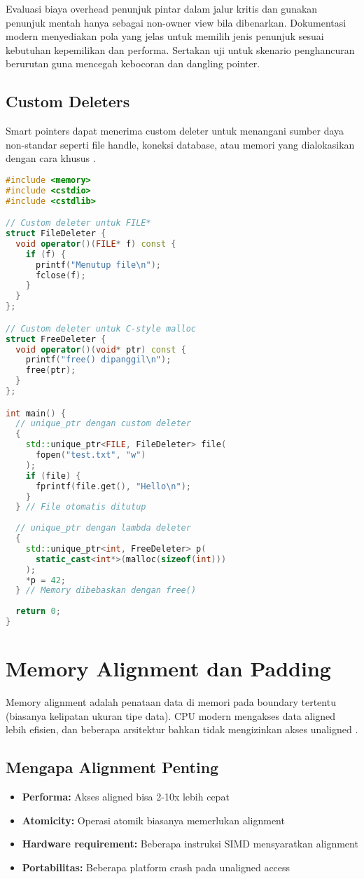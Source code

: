 \documentclass[../main.tex]{subfiles}
\begin{document}
Evaluasi biaya overhead penunjuk pintar dalam jalur kritis dan gunakan penunjuk mentah hanya sebagai non-owner view bila dibenarkan. Dokumentasi modern menyediakan pola yang jelas untuk memilih jenis penunjuk sesuai kebutuhan kepemilikan dan performa. Sertakan uji untuk skenario penghancuran berurutan guna mencegah kebocoran dan dangling pointer.

\subsection{Custom Deleters}
Smart pointers dapat menerima custom deleter untuk menangani sumber daya non-standar seperti file handle, koneksi database, atau memori yang dialokasikan dengan cara khusus \parencite{cpp-reference}.

\begin{lstlisting}[language=C++, caption={Custom deleter dengan unique\_ptr}]
#include <memory>
#include <cstdio>
#include <cstdlib>

// Custom deleter untuk FILE*
struct FileDeleter {
  void operator()(FILE* f) const {
    if (f) {
      printf("Menutup file\n");
      fclose(f);
    }
  }
};

// Custom deleter untuk C-style malloc
struct FreeDeleter {
  void operator()(void* ptr) const {
    printf("free() dipanggil\n");
    free(ptr);
  }
};

int main() {
  // unique_ptr dengan custom deleter
  {
    std::unique_ptr<FILE, FileDeleter> file(
      fopen("test.txt", "w")
    );
    if (file) {
      fprintf(file.get(), "Hello\n");
    }
  } // File otomatis ditutup
  
  // unique_ptr dengan lambda deleter
  {
    std::unique_ptr<int, FreeDeleter> p(
      static_cast<int*>(malloc(sizeof(int)))
    );
    *p = 42;
  } // Memory dibebaskan dengan free()
  
  return 0;
}
\end{lstlisting}

\section{Memory Alignment dan Padding}
Memory alignment adalah penataan data di memori pada boundary tertentu (biasanya kelipatan ukuran tipe data). CPU modern mengakses data aligned lebih efisien, dan beberapa arsitektur bahkan tidak mengizinkan akses unaligned \parencite{iso-c-draft-n1570,cpp-reference}.

\subsection{Mengapa Alignment Penting}
\begin{itemize}
  \item \textbf{Performa:} Akses aligned bisa 2-10x lebih cepat
  \item \textbf{Atomicity:} Operasi atomik biasanya memerlukan alignment
  \item \textbf{Hardware requirement:} Beberapa instruksi SIMD mensyaratkan alignment
  \item \textbf{Portabilitas:} Beberapa platform crash pada unaligned access
\end{itemize}
\end{document}
